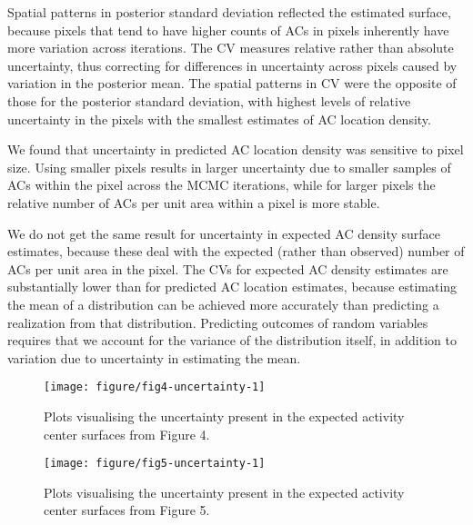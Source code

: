 \documentclass[10pt,a4paper]{article}\usepackage[]{graphicx}\usepackage[]{xcolor}
\makeatletter
\def\maxwidth{ %
  \ifdim\Gin@nat@width>\linewidth
    \linewidth
  \else
    \Gin@nat@width
  \fi
}
\newenvironment{knitrout}{}{} %
\makeatother
\begin{document}
Spatial patterns in posterior standard deviation reflected the
estimated surface, because pixels that tend to have higher counts of
ACs in pixels inherently have more variation across iterations. The CV
measures relative rather than absolute uncertainty, thus correcting
for differences in uncertainty across pixels caused by variation in
the posterior mean. The spatial patterns in CV were the opposite of
those for the posterior standard deviation, with highest levels of
relative uncertainty in the pixels with the smallest estimates of
AC location density.

We found that uncertainty in predicted AC location density was sensitive to
pixel size. Using smaller pixels results in larger uncertainty due to
smaller samples of ACs within the pixel across the MCMC iterations,
while for larger pixels the relative number of ACs per unit area
within a pixel is more stable.

We do not get the same result for uncertainty in expected AC density
surface estimates, because these deal with the expected (rather than
observed) number of ACs per unit area in the pixel. The CVs for
expected AC density estimates are substantially lower than for
predicted AC location estimates, because estimating the mean of a
distribution can be achieved more accurately than predicting a
realization from that distribution. Predicting outcomes of random
variables requires that we account for the variance of the
distribution itself, in addition to variation due to uncertainty in
estimating the mean.

\begin{knitrout}
\color{fgcolor}\begin{figure}
\texttt{[image: figure/fig4-uncertainty-1]} \caption[Plots visualising the uncertainty present in the expected activity center surfaces from Figure 4]{Plots visualising the uncertainty present in the expected activity center surfaces from Figure 4.}\label{fig:fig4-uncertainty}
\end{figure}

\end{knitrout}

\begin{knitrout}
\color{fgcolor}\begin{figure}
\texttt{[image: figure/fig5-uncertainty-1]} \caption[Plots visualising the uncertainty present in the expected activity center surfaces from Figure 5]{Plots visualising the uncertainty present in the expected activity center surfaces from Figure 5.}\label{fig:fig5-uncertainty}
\end{figure}

\end{knitrout}
\end{document}
